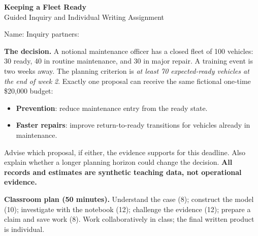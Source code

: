 \documentclass[10pt,letterpaper]{article}
\begin{document}
\begin{center}
{\Large\bfseries Keeping a Fleet Ready}\\
{\large Guided Inquiry and Individual Writing Assignment}
\end{center}
Name: \underline{\hspace{2.3in}}\quad Inquiry partners: \underline{\hspace{2.1in}}

\textbf{The decision.} A notional maintenance officer has a closed fleet of 100 vehicles: 30 ready, 40 in routine maintenance, and 30 in major repair. A training event is two weeks away. The planning criterion is \emph{at least 70 expected-ready vehicles at the end of week 2}. Exactly one proposal can receive the same fictional one-time \$20,000 budget:
\begin{itemize}[nosep]
\item \textbf{Prevention}: reduce maintenance entry from the ready state.
\item \textbf{Faster repairs}: improve return-to-ready transitions for vehicles already in maintenance.
\end{itemize}
Advise which proposal, if either, the evidence supports for this deadline. Also explain whether a longer planning horizon could change the decision. \textbf{All records and estimates are synthetic teaching data, not operational evidence.}

\textbf{Classroom plan (50 minutes).} Understand the case (8); construct the model (10); investigate with the notebook (12); challenge the evidence (12); prepare a claim and save work (8). Work collaboratively in class; the final written product is individual.
\end{document}
